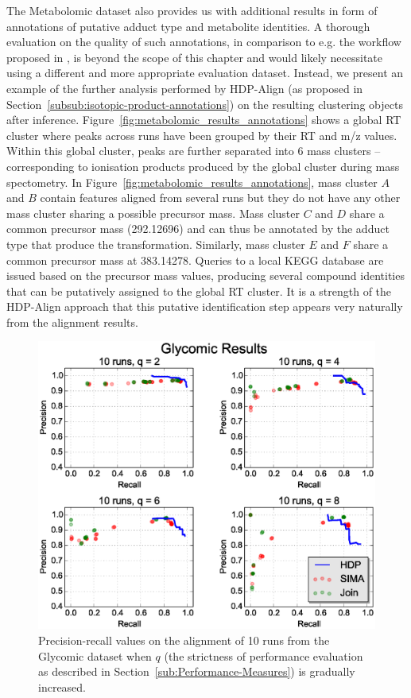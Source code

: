 The Metabolomic dataset also provides us with additional results in form of annotations of putative adduct type and metabolite identities. A thorough evaluation on the quality of such annotations, in comparison to e.g. the workflow proposed in \cite{Lee2013}, is beyond the scope of this chapter and would likely necessitate using a different and more appropriate evaluation dataset. Instead, we present an example of the further analysis performed by HDP-Align (as proposed in Section~\ref{subsub:isotopic-product-annotations}) on the resulting clustering objects after inference. Figure~\ref{fig:metabolomic_results_annotations} shows a global \ac{RT} cluster where peaks across runs have been grouped by their \ac{RT} and m/z values. Within this global cluster, peaks are further separated into 6 mass clusters -- corresponding to ionisation products produced by the global cluster during mass spectometry. In Figure~\ref{fig:metabolomic_results_annotations}, mass cluster $A$ and $B$ contain features aligned from several runs but they do not have any other mass cluster sharing a possible precursor mass. Mass cluster $C$ and $D$ share a common precursor mass (292.12696) and can thus be annotated by the adduct type that produce the transformation. Similarly, mass cluster $E$ and $F$ share a common precursor mass at 383.14278. Queries to a local KEGG database are issued based on the precursor mass values, producing several compound identities that can be putatively assigned to the global \ac{RT} cluster. It is a strength of the HDP-Align approach that this putative identification step appears very naturally from the alignment results.

\begin{figure}[!htbp]
\centering\includegraphics[width=0.7\linewidth]{06-hdp/figures/figure_5.eps}
\centering\caption{\label{fig:glycomic_results}Precision-recall values on the alignment of 10 runs from the Glycomic dataset when $q$ (the strictness of performance evaluation as described in Section~\ref{sub:Performance-Measures}) is gradually increased.}
\end{figure}

